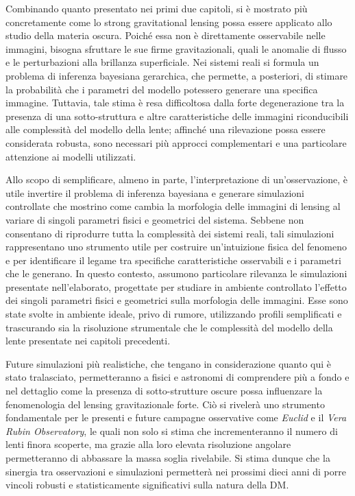 Combinando quanto presentato nei primi due capitoli, si è mostrato più concretamente come lo strong gravitational lensing possa essere applicato allo studio della materia oscura. Poiché essa non è direttamente osservabile nelle immagini, bisogna sfruttare le sue firme gravitazionali, quali le anomalie di flusso e le perturbazioni alla brillanza superficiale. Nei sistemi reali si formula un problema di inferenza bayesiana gerarchica, che permette, a posteriori, di stimare la probabilità che i parametri del modello potessero generare una specifica immagine. Tuttavia, tale stima è resa difficoltosa dalla forte degenerazione tra la presenza di una sotto-struttura e altre caratteristiche delle immagini riconducibili alle complessità del modello della lente; affinché una rilevazione possa essere considerata robusta, sono necessari più approcci complementari e una particolare attenzione ai modelli utilizzati.

Allo scopo di semplificare, almeno in parte, l'interpretazione di un'osservazione, è utile invertire il problema di inferenza bayesiana e generare simulazioni controllate che mostrino come cambia la morfologia delle immagini di lensing al variare di singoli parametri fisici e geometrici del sistema. Sebbene non consentano di riprodurre tutta la complessità dei sistemi reali, tali simulazioni rappresentano uno strumento utile per costruire un'intuizione fisica del fenomeno e per identificare il legame tra specifiche caratteristiche osservabili e i parametri che le generano. In questo contesto, assumono particolare rilevanza le simulazioni presentate nell'elaborato, progettate per studiare in ambiente controllato l'effetto dei singoli parametri fisici e geometrici sulla morfologia delle immagini. Esse sono state svolte in ambiente ideale, privo di rumore, utilizzando profili semplificati e trascurando sia la risoluzione strumentale che le complessità del modello della lente presentate nei capitoli precedenti.

Future simulazioni più realistiche, che tengano in considerazione quanto qui è stato tralasciato, permetteranno a fisici e astronomi di comprendere più a fondo e nel dettaglio come la presenza di sotto-strutture oscure possa influenzare la fenomenologia del lensing gravitazionale forte. Ciò si rivelerà uno strumento fondamentale per le presenti e future campagne osservative come \emph{Euclid} e il \emph{Vera Rubin Observatory}, le quali non solo si stima che incrementeranno il numero di lenti finora scoperte, ma grazie alla loro elevata risoluzione angolare permetteranno di abbassare la massa soglia rivelabile. Si stima dunque che la sinergia tra osservazioni e simulazioni permetterà nei prossimi dieci anni di porre vincoli robusti e statisticamente significativi sulla natura della DM.  
